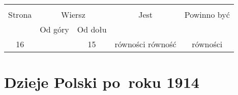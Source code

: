 \documentclass[a4paper,11pt]{article}
\begin{document}


\begin{center}

  \begin{tabular}{|c|c|c|c|c|}
    \hline
    & \multicolumn{2}{c|}{} & & \\
    Strona & \multicolumn{2}{c|}{Wiersz} & Jest
                              & Powinno być \\ \cline{2-3}
    & Od góry & Od dołu & & \\
    \hline
    16 & & 15 & równości równość & równości \\
    \hline
  \end{tabular}

\end{center}

\vspace{\spaceTwo}










\newpage
\section{Dzieje Polski po~roku 1914}






\end{document}
